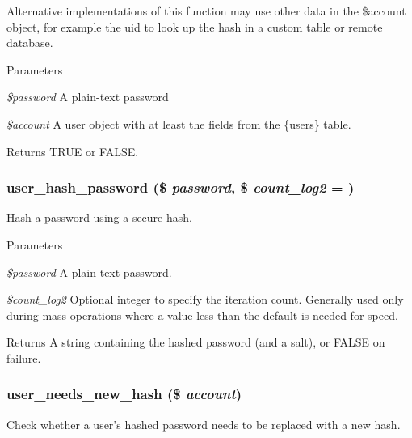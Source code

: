 Alternative implementations of this function may use other data in the \$account object, for example the uid to look up the hash in a custom table or remote database.


\begin{DoxyParams}{Parameters}
\item[{\em \$password}]A plain-\/text password \item[{\em \$account}]A user object with at least the fields from the \{users\} table.\end{DoxyParams}
\begin{DoxyReturn}{Returns}
TRUE or FALSE. 
\end{DoxyReturn}
\hypertarget{password_8inc_a7fa51cbbe5dd15f39953097ea25eb237}{
\subsubsection[{user\_\-hash\_\-password}]{\setlength{\rightskip}{0pt plus 5cm}user\_\-hash\_\-password (\$ {\em password}, \/  \$ {\em count\_\-log2} = {})}}
\label{password_8inc_a7fa51cbbe5dd15f39953097ea25eb237}
Hash a password using a secure hash.


\begin{DoxyParams}{Parameters}
\item[{\em \$password}]A plain-\/text password. \item[{\em \$count\_\-log2}]Optional integer to specify the iteration count. Generally used only during mass operations where a value less than the default is needed for speed.\end{DoxyParams}
\begin{DoxyReturn}{Returns}
A string containing the hashed password (and a salt), or FALSE on failure. 
\end{DoxyReturn}
\hypertarget{password_8inc_a5c5ff8dd0c7fb7880535bacd445a5574}{
\subsubsection[{user\_\-needs\_\-new\_\-hash}]{\setlength{\rightskip}{0pt plus 5cm}user\_\-needs\_\-new\_\-hash (\$ {\em account})}}
\label{password_8inc_a5c5ff8dd0c7fb7880535bacd445a5574}
Check whether a user's hashed password needs to be replaced with a new hash.

